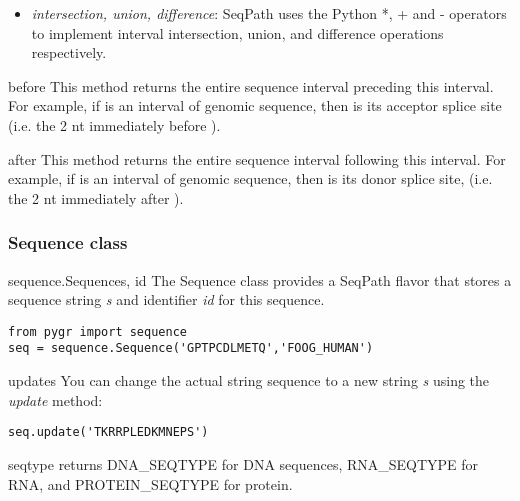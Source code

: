\documentclass{howto}
\begin{document}
\begin{itemize}
\item
{\em intersection, union, difference}: SeqPath uses the Python *, + and - 
operators to implement interval intersection, union, and difference
operations respectively.

\end{itemize}

\begin{funcdesc}{before}{} 
  This method returns the entire sequence interval preceding this interval.
  For example, if  is an interval of genomic sequence, then
   is its acceptor splice site (i.e. the 2 nt immediately
  before ).
\end{funcdesc}

\begin{funcdesc}{after}{} 
  This method returns the entire sequence interval following this interval.
  For example, if  is an interval of genomic sequence, then
   is its donor splice site, (i.e. the 2 nt immediately
  after ).
\end{funcdesc}


\subsubsection{Sequence class}

\begin{funcdesc}{sequence.Sequence}{s, id}
  The Sequence class provides a SeqPath flavor that stores a sequence string
  {\em s} and identifier {\em id} for this sequence.

\begin{verbatim}
from pygr import sequence
seq = sequence.Sequence('GPTPCDLMETQ','FOOG_HUMAN')
\end{verbatim}
\end{funcdesc}


\begin{funcdesc}{update}{s}
  You can change the actual string sequence to a new string {\em s}
  using the {\em update} method:

\begin{verbatim}
seq.update('TKRRPLEDKMNEPS')
\end{verbatim}
\end{funcdesc}

\begin{funcdesc}{seqtype}{}
  returns DNA_SEQTYPE for DNA sequences, 
  RNA_SEQTYPE for RNA, and PROTEIN_SEQTYPE for protein.
\end{funcdesc}
\end{document}
